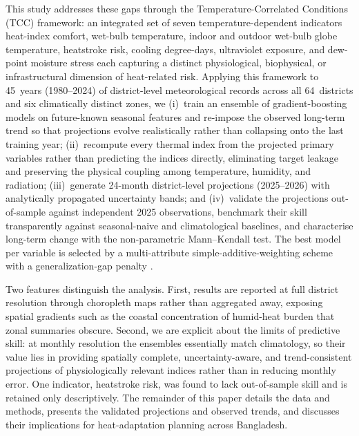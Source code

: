 \documentclass[review,11pt]{elsarticle}
\begin{document}
This study addresses these gaps through the Temperature-Correlated Conditions
(TCC) framework: an integrated set of seven temperature-dependent indicators
 heat-index comfort, wet-bulb temperature, indoor and outdoor wet-bulb globe
temperature, heatstroke risk, cooling degree-days, ultraviolet exposure, and
dew-point moisture stress each capturing a distinct physiological, biophysical,
or infrastructural dimension of heat-related risk. Applying this framework to
45~years (1980--2024) of district-level meteorological records across all
64~districts and six climatically distinct zones, we (i)~train an ensemble of
gradient-boosting models \citep{Breiman2001} on future-known seasonal features and
re-impose the observed long-term trend so that projections evolve realistically
rather than collapsing onto the last training year; (ii)~recompute every thermal
index from the projected primary variables rather than predicting the indices
directly, eliminating target leakage and preserving the physical coupling among
temperature, humidity, and radiation; (iii)~generate 24-month district-level
projections (2025--2026) with analytically propagated uncertainty bands; and
(iv)~validate the projections out-of-sample against independent 2025 observations,
benchmark their skill transparently against seasonal-naive and climatological
baselines, and characterise long-term change with the non-parametric
Mann--Kendall test. The best model per variable is selected by a multi-attribute
simple-additive-weighting scheme with a generalization-gap penalty
\citep{Hwang1981}.

Two features distinguish the analysis. First, results are reported at full
district resolution through choropleth maps rather than aggregated away, exposing
spatial gradients such as the coastal concentration of humid-heat burden that
zonal summaries obscure. Second, we are explicit about the limits of predictive
skill: at monthly resolution the ensembles essentially match climatology, so their
value lies in providing spatially complete, uncertainty-aware, and
trend-consistent projections of physiologically relevant indices rather than in
reducing monthly error. One indicator, heatstroke risk, was found to lack
out-of-sample skill and is retained only descriptively. The remainder of this
paper details the data and methods, presents the validated projections and
observed trends, and discusses their implications for heat-adaptation planning
across Bangladesh.

\end{document}
